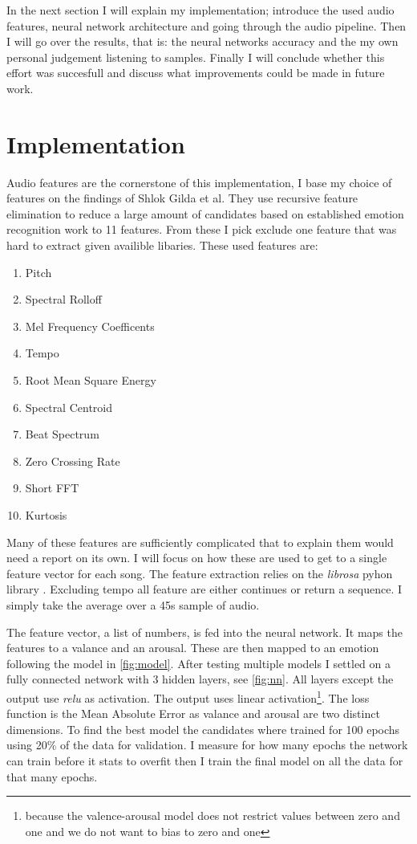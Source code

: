 \documentclass[lang=en, hanging-titles=true]{skrapport}
\begin{document}
In the next section I will explain my implementation; introduce the used audio features, neural network architecture and going through the audio pipeline. Then I will go over the results, that is: the neural networks accuracy and the my own personal judgement listening to samples. Finally I will conclude whether this effort was succesfull and discuss what improvements could be made in future work.

\section{Implementation}
Audio features are the cornerstone of this implementation, I base my choice of features on the findings of Shlok Gilda et al\cite{features}. They use recursive feature elimination to reduce a large amount of candidates based on established emotion recognition work to 11 features. From these I pick exclude one feature that was hard to extract given availible libaries. These used features are:

\begin{multicols}{2}
\begin{enumerate}
	\item Pitch
	\item Spectral Rolloff
	\item Mel Frequency Coefficents
	\item Tempo
	\item Root Mean Square Energy
	\item Spectral Centroid
	\item Beat Spectrum
	\item Zero Crossing Rate
	\item Short FFT
	\item Kurtosis
\end{enumerate}
\end{multicols}

Many of these features are sufficiently complicated that to explain them would need a report on its own. I will focus on how these are used to get to a single feature vector for each song. The feature extraction relies on the \textit{librosa} pyhon library \cite{librosa}. Excluding tempo all feature are either continues or return a sequence. I simply take the average over a 45s sample of audio. 

The feature vector, a list of numbers, is fed into the neural network. It maps the features to a valance and an arousal. These are then mapped to an emotion following the model in \cref{fig:model}. After testing multiple models I settled on a fully connected network with 3 hidden layers, see \cref{fig:nn}. All layers except the output use \textit{relu} as activation. The output uses linear activation\footnote{because the valence-arousal model does not restrict values between zero and one and we do not want to bias to zero and one}. The loss function is the Mean Absolute Error as valance and arousal are two distinct dimensions. To find the best model the candidates where trained for 100 epochs using 20\% of the data for validation. I measure for how many epochs the network can train before it stats to overfit then I train the final model on all the data for that many epochs.
\end{document}
